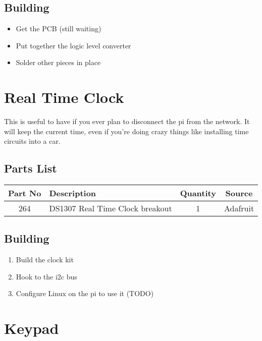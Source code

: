 \documentclass[11pt]{article}
\begin{document}
\subsection{Building}
\begin{itemize}
\item Get the PCB (still waiting)
\item Put together the logic level converter
\item Solder other pieces in place
\end{itemize}

\pagebreak
\section{Real Time Clock}

This is useful to have if you ever plan to disconnect the pi from
the network.  It will keep the current time, even if you're doing
crazy things like installing time circuits into a car.

\subsection{Parts List}

\begin{tabular}{|c|l|c|c|}
\hline
Part No	&  Description			&  Quantity	& Source \\
\hline
\hline
264	& DS1307 Real Time Clock breakout & 1	& Adafruit \\ %
\hline
\end{tabular}

\subsection{Building}

\begin{enumerate}
\item Build the clock kit
\item Hook to the i2c bus
\item Configure Linux on the pi to use it (TODO)
\end{enumerate}


\pagebreak
\section{Keypad}
\end{document}
